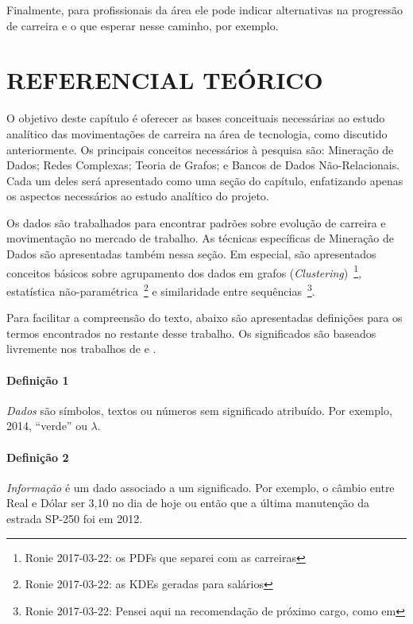 \documentclass[12pt,a4paper]{article}
\begin{document}
Finalmente, para profissionais da área ele pode indicar alternativas na progressão de carreira e o que esperar nesse caminho, por exemplo.

\section{REFERENCIAL TEÓRICO}

O objetivo deste capítulo é oferecer as bases conceituais necessárias ao estudo analítico das movimentações de carreira na área de tecnologia, como discutido anteriormente. Os principais conceitos necessários à pesquisa são: Mineração de Dados; Redes Complexas; Teoria de Grafos; e Bancos de Dados Não-Relacionais. Cada um deles será apresentado como uma seção do capítulo, enfatizando apenas os aspectos necessários ao estudo analítico do projeto.

Os dados são trabalhados para encontrar padrões sobre evolução de carreira e movimentação no mercado de trabalho. As técnicas específicas de Mineração de Dados são apresentadas também nessa seção. Em especial, são apresentados conceitos básicos sobre agrupamento dos dados em grafos (\textit{Clustering})~\footnote{Ronie 2017-03-22: os PDFs que separei com as carreiras}, estatística não-paramétrica~\footnote{Ronie 2017-03-22: as KDEs geradas para salários} e similaridade entre sequências~\footnote{Ronie 2017-03-22: Pensei aqui na recomendação de próximo cargo, como em }.

Para facilitar a compreensão do texto, abaixo são apresentadas definições para os termos encontrados no restante desse trabalho. Os significados são baseados livremente nos trabalhos de  e .


\paragraph{Definição 1}
\textit{Dados} são símbolos, textos ou números sem significado atribuído. Por exemplo, 2014, \enquote{verde} ou $\lambda$.

\paragraph{Definição 2}
\textit{Informação} é um dado associado a um significado. Por exemplo, o câmbio entre Real e Dólar ser 3,10 no dia de hoje ou então que a última manutenção da estrada SP-250 foi em 2012.
\end{document}
